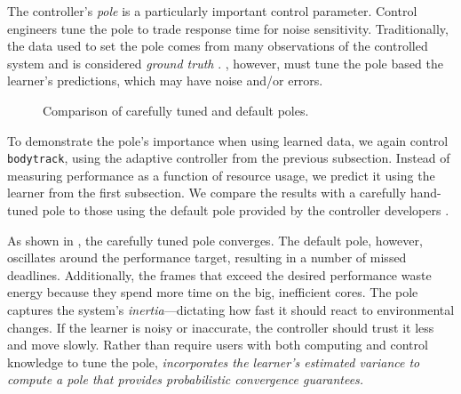 The controller's \emph{pole} is a particularly important control
parameter.  Control engineers tune the pole to trade response time for
noise sensitivity.  Traditionally, the data used to set the pole comes
from many observations of the controlled system and is considered
\emph{ground truth} \cite{Hellerstein2004a}.  \SYSTEM{}, however, must
tune the pole based the learner's predictions, which may have noise
and/or errors.


\begin{figure} 

\caption{Comparison of carefully tuned and default poles.}
\label{fig:not-simple}
\end{figure}
To demonstrate the pole's importance when using learned data, we again
control \texttt{bodytrack}, using the adaptive controller from the
previous subsection. Instead of measuring performance as a function of
resource usage, we predict it using the learner from the first
subsection.  We compare the results with a carefully hand-tuned pole
to those using the default pole provided by the controller developers
\cite{POET}.

As shown in , the carefully tuned pole
converges. The default pole, however, oscillates around the
performance target, resulting in a number of missed deadlines.
Additionally, the frames that exceed the desired performance waste
energy because they spend more time on the big, inefficient cores. The
pole captures the system's \emph{inertia}---dictating how fast it
should react to environmental changes.  If the learner is noisy or
inaccurate, the controller should trust it less and move slowly.
Rather than require users with both computing and control knowledge to
tune the pole, \emph{\SYSTEM{} incorporates the learner's estimated
  variance to compute a pole that provides probabilistic convergence
  guarantees.}


